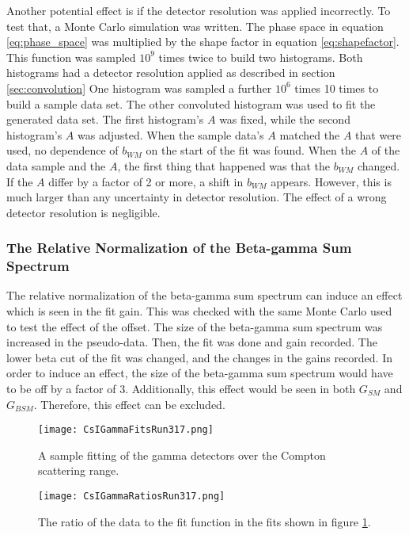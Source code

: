 \documentclass[../MaxHughesThesis.tex]{subfiles}
\begin{document}
Another potential effect is if the detector resolution was applied incorrectly.
To test that, a Monte Carlo simulation was written.
The phase space in equation \ref{eq:phase_space} was multiplied by the shape factor in equation \ref{eq:shapefactor}.
This function was sampled $10^{9}$ times twice to build two histograms. 
Both histograms had a detector resolution applied as described in section \ref{sec:convolution}
One histogram was sampled a further $10^{6}$ times 10 times to build a sample data set.
The other convoluted histogram was used to fit the generated data set.
The first histogram's $A$ was fixed, while the second histogram's $A$ was adjusted.
When the sample data's $A$ matched the $A$ that were used, no dependence of $b_{WM}$ on the start of the fit was found.
When the $A$ of the data sample and the $A$, the first thing that happened was that the $b_{WM}$ changed.
If the $A$ differ by a factor of 2 or more, a shift in $b_{WM}$ appears.
However, this is much larger than any uncertainty in detector resolution.
The effect of a wrong detector resolution is negligible. 

\subsubsection{The Relative Normalization of the Beta-gamma Sum Spectrum}

The relative normalization of the beta-gamma sum spectrum can induce an effect which is seen in the fit gain.
This was checked with the same Monte Carlo used to test the effect of the offset.
The size of the beta-gamma sum spectrum was increased in the pseudo-data.
Then, the fit was done and gain recorded.
The lower beta cut of the fit was changed, and the changes in the gains recorded.
In order to induce an effect, the size of the beta-gamma sum spectrum would have to be off by a factor of 3.
Additionally, this effect would be seen in both $G_{SM}$ and $G_{BSM}$. 
Therefore, this effect can be excluded.

\begin{figure}[!htb]
	\centerline{\texttt{[image: CsIGammaFitsRun317.png]}}
	\caption{A sample fitting of the gamma detectors over the Compton scattering range.} 
	\label{fig:GammaFit}
\end{figure}

\begin{figure}[!htb]
	\centerline{\texttt{[image: CsIGammaRatiosRun317.png]}}
	\caption{The ratio of the data to the fit function in the fits shown in figure \ref{fig:GammaFit}.}
	\label{fig:GammaRatio}
\end{figure}
\end{document}
